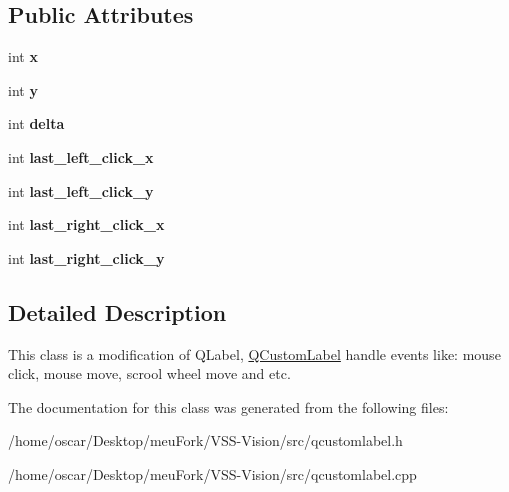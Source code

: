 \subsection*{Public Attributes}
\begin{DoxyCompactItemize}
\item 
\hypertarget{classQCustomLabel_a509c6eb2bc4e80ad72901c1afc976b92}{int {\bfseries x}}\label{classQCustomLabel_a509c6eb2bc4e80ad72901c1afc976b92}

\item 
\hypertarget{classQCustomLabel_a3d3309c76e47ccba7101e5504091804c}{int {\bfseries y}}\label{classQCustomLabel_a3d3309c76e47ccba7101e5504091804c}

\item 
\hypertarget{classQCustomLabel_a64b5c030bb65139b76f063de1d0784bf}{int {\bfseries delta}}\label{classQCustomLabel_a64b5c030bb65139b76f063de1d0784bf}

\item 
\hypertarget{classQCustomLabel_a5fa4f875b266bd86a552867e60be86da}{int {\bfseries last\-\_\-left\-\_\-click\-\_\-x}}\label{classQCustomLabel_a5fa4f875b266bd86a552867e60be86da}

\item 
\hypertarget{classQCustomLabel_abb541cfa1a5ceb23f29bc08573838bcd}{int {\bfseries last\-\_\-left\-\_\-click\-\_\-y}}\label{classQCustomLabel_abb541cfa1a5ceb23f29bc08573838bcd}

\item 
\hypertarget{classQCustomLabel_a7b13426cb8aedd2d0af1d55502d61325}{int {\bfseries last\-\_\-right\-\_\-click\-\_\-x}}\label{classQCustomLabel_a7b13426cb8aedd2d0af1d55502d61325}

\item 
\hypertarget{classQCustomLabel_a85b2496bc41541923c82ef03894885a7}{int {\bfseries last\-\_\-right\-\_\-click\-\_\-y}}\label{classQCustomLabel_a85b2496bc41541923c82ef03894885a7}

\end{DoxyCompactItemize}


\subsection{Detailed Description}
This class is a modification of Q\-Label, \hyperlink{classQCustomLabel}{Q\-Custom\-Label} handle events like\-: mouse click, mouse move, scrool wheel move and etc. 

The documentation for this class was generated from the following files\-:\begin{DoxyCompactItemize}
\item 
/home/oscar/\-Desktop/meu\-Fork/\-V\-S\-S-\/\-Vision/src/qcustomlabel.\-h\item 
/home/oscar/\-Desktop/meu\-Fork/\-V\-S\-S-\/\-Vision/src/qcustomlabel.\-cpp\end{DoxyCompactItemize}
